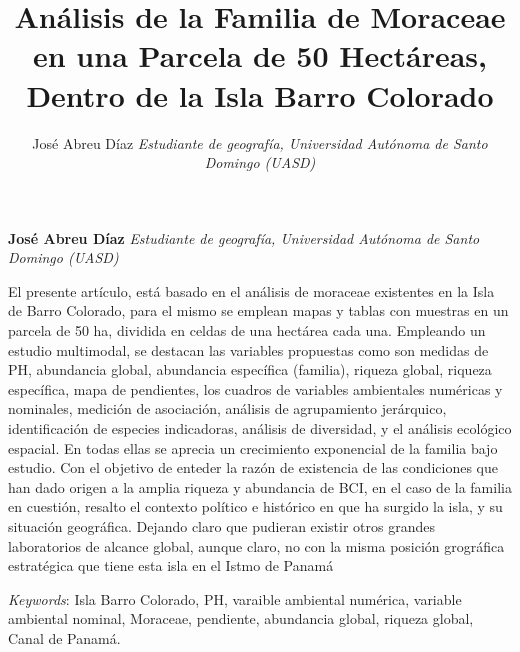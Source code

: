 \documentclass[11pt,]{article}
\title{Análisis de la Familia de Moraceae en una Parcela de 50 Hectáreas,
Dentro de la Isla Barro Colorado  }
\author{\Large José Abreu Díaz\vspace{0.05in} \newline\normalsize\emph{Estudiante de geografía, Universidad Autónoma de Santo Domingo (UASD)}  }
\date{}
\newcommand*{\authorfont}{\fontfamily{phv}\selectfont}
\renewenvironment{abstract}
 {{%
    \setlength{\leftmargin}{0mm}
    \setlength{\rightmargin}{\leftmargin}%
  }%
  \relax}
 {\endlist}
\begin{document}
	
%

{%
\setlength{\parindent}{0pt}
\thispagestyle{plain}
{\fontsize{18}{20}\selectfont\raggedright 
\maketitle  %

}

{
   \vskip 13.5pt\relax \normalsize\fontsize{11}{12} 
\textbf{\authorfont José Abreu Díaz} \hskip 15pt \emph{\small Estudiante de geografía, Universidad Autónoma de Santo Domingo (UASD)}   

}

}








\begin{abstract}

    \hbox{\vrule height .2pt width 39.14pc}

    \vskip 8.5pt %

\noindent El presente artículo, está basado en el análisis de moraceae existentes
en la Isla de Barro Colorado, para el mismo se emplean mapas y tablas
con muestras en un parcela de 50 ha, dividida en celdas de una hectárea
cada una. Empleando un estudio multimodal, se destacan las variables
propuestas como son medidas de PH, abundancia global, abundancia
específica (familia), riqueza global, riqueza específica, mapa de
pendientes, los cuadros de variables ambientales numéricas y nominales,
medición de asociación, análisis de agrupamiento jerárquico,
identificación de especies indicadoras, análisis de diversidad, y el
análisis ecológico espacial. En todas ellas se aprecia un crecimiento
exponencial de la familia bajo estudio. Con el objetivo de enteder la
razón de existencia de las condiciones que han dado origen a la amplia
riqueza y abundancia de BCI, en el caso de la familia en cuestión,
resalto el contexto político e histórico en que ha surgido la isla, y su
situación geográfica. Dejando claro que pudieran existir otros grandes
laboratorios de alcance global, aunque claro, no con la misma posición
grográfica estratégica que tiene esta isla en el Istmo de Panamá


\vskip 8.5pt \noindent \emph{Keywords}: Isla Barro Colorado, PH, varaible ambiental numérica, variable ambiental
nominal, Moraceae, pendiente, abundancia global, riqueza global, Canal
de Panamá. \par

    \hbox{\vrule height .2pt width 39.14pc}



\end{abstract}
\end{document}
